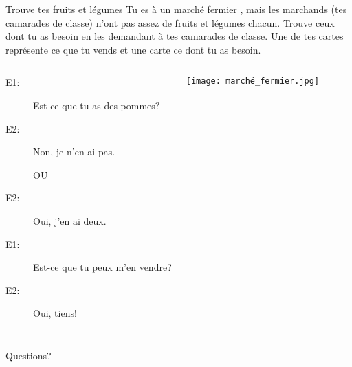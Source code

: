 \documentclass{beamer}
\begin{document}
  \begin{frame}{Trouve tes fruits et légumes}
    Tu es à un marché fermier , mais les marchands (tes camarades de classe) n'ont pas assez de fruits et légumes chacun.
    Trouve ceux dont tu as besoin en les demandant à tes camarades de classe.
    Une de tes cartes représente ce que tu vends et une carte ce dont tu as besoin. \\
    \begin{columns}
        \small
        \begin{description}
          \item[E1:] Est-ce que tu as des pommes?
          \item[E2:] Non, je n'\alert{en} ai pas.
          \item[] OU
          \item[E2:] Oui, j'\alert{en} ai \alert{deux}.
          \item[E1:] Est-ce que tu peux m'\alert{en} vendre?
          \item[E2:] Oui, tiens!
        \end{description}
        \begin{center}
          \texttt{[image: marché\_fermier.jpg]}
        \end{center}
    \end{columns}
  \end{frame}

  \begin{frame}{}
    \begin{center}
      \Large Questions?
    \end{center}
  \end{frame}
\end{document}
